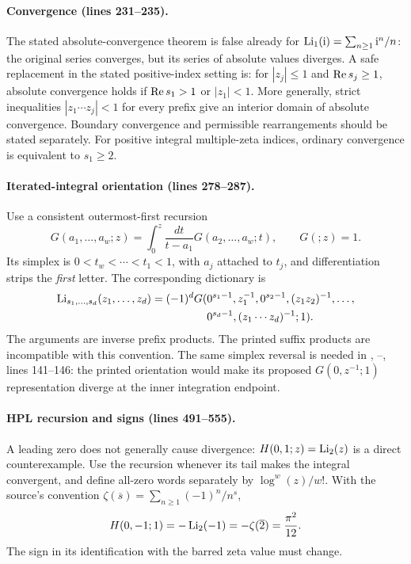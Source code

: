 \paragraph{Convergence (lines 231--235).}
The stated absolute-convergence theorem is false already for
\(\operatorname{Li}_1(\mathrm{i})=\sum_{n\ge1}\mathrm{i}^n/n\): the original series converges,
but its series of absolute values diverges.
A safe replacement in the stated positive-index setting is:
for \(|z_j|\le1\) and \(\operatorname{Re} s_j\ge1\), absolute convergence
holds if \(\operatorname{Re} s_1>1\) or \(|z_1|<1\).
More generally, strict inequalities
\(|z_1\cdots z_j|<1\) for every prefix give an interior domain of
absolute convergence. Boundary convergence and permissible
rearrangements should be stated separately. For positive integral
multiple-zeta indices, ordinary convergence is equivalent to
\(s_1\ge2\).

\paragraph{Iterated-integral orientation (lines 278--287).}
Use a consistent outermost-first recursion
\[
G(a_1,\ldots,a_w;z)=\int_0^z\frac{dt}{t-a_1}
                         G(a_2,\ldots,a_w;t),\qquad G(;z)=1.
\]
Its simplex is \(0<t_w<\cdots<t_1<1\), with \(a_j\) attached to
\(t_j\), and differentiation strips the \emph{first} letter.
The corresponding dictionary is
\begin{align*}
\operatorname{Li}_{s_1,\ldots,s_d}(z_1,\ldots,z_d)
=(-1)^dG(&0^{s_1-1},z_1^{-1},
          0^{s_2-1},(z_1z_2)^{-1},\ldots,\\
         &0^{s_d-1},(z_1\cdots z_d)^{-1};1).
\end{align*}
The arguments are inverse prefix products. The printed suffix
products are incompatible with this convention.
The same simplex reversal is needed in
,
--, lines 141--146:
the printed orientation would make its proposed \(G(0,z^{-1};1)\)
representation diverge at the inner integration endpoint.

\paragraph{HPL recursion and signs (lines 491--555).}
A leading zero does not generally cause divergence:
\(H(0,1;z)=\operatorname{Li}_2(z)\) is a direct counterexample.
Use the recursion whenever its tail makes the integral convergent,
and define all-zero words separately by \(\log^w(z)/w!\).
With the source's convention
\(\zeta(\overline{s})=\sum_{n\ge1}(-1)^n/n^s\),
\[
H(0,-1;1)=-\operatorname{Li}_2(-1)=-\zeta(\overline2)=\frac{\pi^2}{12}.
\]
The sign in its identification with the barred zeta value must change.


